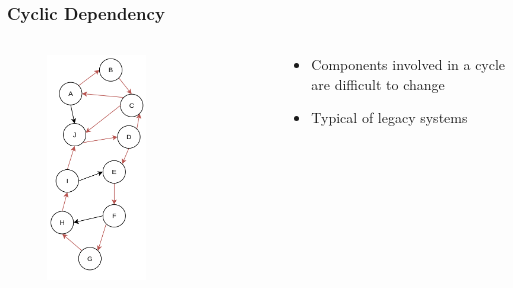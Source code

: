 \documentclass[dvipsnames, 10pt]{beamer}
\begin{document}
\begin{frame}
  \frametitle{Cyclic Dependency}
  \begin{columns}
    \begin{column}{0.5\textwidth}
      \begin{figure}
        \begin{center}
          \includegraphics[width=0.55\textwidth]{figures/architectural-smells/cyclic-dependency.png}
        \end{center}
      \end{figure}
    \end{column}
    \begin{column}{0.5\textwidth}
      \begin{itemize}
        \item Components involved in a cycle are difficult to change
        \item Typical of legacy systems
      \end{itemize}
    \end{column}
  \end{columns}
\end{frame}
\end{document}
